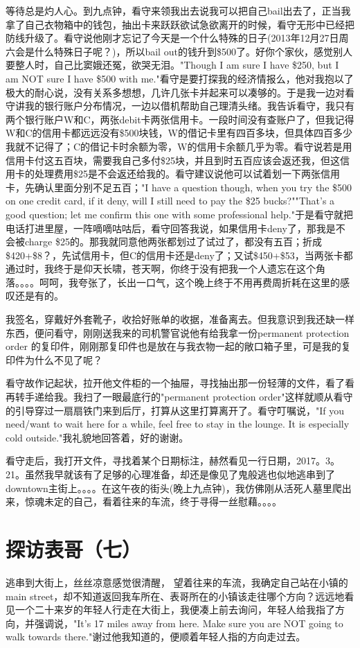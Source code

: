 \documentclass[12pt]{book}
\begin{document}
等待总是灼人心。到九点钟，看守来领我出去说我可以把自己bail出去了，正当我拿了自己衣物箱中的钱包，抽出卡来跃跃欲试急欲离开的时候，看守无形中已经把防线升级了。看守说他刚才忘记了今天是一个什么特殊的日子(2013年12月27日周六会是什么特殊日子呢？)，所以bail out的钱升到\$500了。好你个家伙，感觉别人要整人时，自己比窦娥还冤，欲哭无泪。"Though I am sure I have \$250, but I am NOT sure I have \$500 with me."看守是要打探我的经济情报么，他对我抱以了极大的耐心说，没有关系多想想，几许几张卡并起来可以凑够的。于是我一边对看守讲我的银行账户分布情况，一边以借机帮助自己理清头绪。我告诉看守，我只有两个银行账户W和C，两张debit卡两张信用卡。一段时间没有查账户了，但我记得W和C的信用卡都远远没有\$500块钱，W的借记卡里有四百多块，但具体四百多少我就不记得了；C的借记卡时余额为零，W的信用卡余额几乎为零。看守说若是用信用卡付这五百块，需要我自己多付\$25块，并且到时五百应该会返还我，但这信用卡的处理费用\$25是不会返还给我的。看守建议说他可以试着划一下两张信用卡，先确认里面分别不足五百；"I have a question though, when you try the \$500 on one credit card, if it deny, will I still need to pay the \$25 bucks?""That's a good question; let me confirm this one with some professional help."于是看守就把电话打进里屋，一阵嘀嘀咕咕后，看守回答我说，如果信用卡deny了，那我是不会被charge \$25的。那我就同意他两张都划过了试过了，都没有五百；折成\$420+\$8？，先试信用卡，但C的信用卡还是deny了；又试\$450+\$53，当两张卡都通过时，我终于是仰天长啸，苍天啊，你终于没有把我一个人遗忘在这个角落。。。。呵呵，我夸张了，长出一口气，这个晚上终于不用再费周折耗在这里的感叹还是有的。

我签名，穿戴好外套靴子，收拾好账单的收据，准备离去。但我意识到我还缺一样东西，便问看守，刚刚送我来的司机警官说他有给我拿一份permanent protection order 的复印件，刚刚那复印件也是放在与我衣物一起的敞口箱子里，可是我的复印件为什么不见了呢？

看守故作记起状，拉开他文件柜的一个抽屉，寻找抽出那一份轻薄的文件，看了看再转手递给我。我扫了一眼最底行的"permanent protection order"这样就顺从看守的引导穿过一扇扇铁门来到后厅，打算从这里打算离开了。看守叮嘱说，"If you need/want to wait here for a while, feel free to stay in the lounge. It is especially cold outside."我礼貌地回答着，好的谢谢。

看守走后，我打开文件，寻找着某个日期标注，赫然看见一行日期，2017。3。21。虽然我早就该有了足够的心理准备，却还是像见了鬼般逃也似地逃串到了downtown主街上。。。。在这午夜的街头(晚上九点钟)，我仿佛刚从活死人墓里爬出来，惊魂未定的自己，看着往来的车流，终于寻得一丝慰藉。。。。
\section{探访表哥（七）}
\label{sec-37-7}
逃串到大街上，丝丝凉意感觉很清醒， 望着往来的车流，我确定自己站在小镇的main street，却不知道返回我车所在、表哥所在的小镇该走往哪个方向？远远地看见一个二十来岁的年轻人行走在大街上，我便凑上前去询问，年轻人给我指了方向，并强调说，"It's 17 miles away from here. Make sure you are NOT going to walk towards there."谢过他我知道的，便顺着年轻人指的方向走过去。
\end{document}
